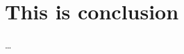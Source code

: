 \chapter{This is conclusion}\label{ch:conclusion}

\ldots

\instructionsconclusions


\cleardoublepage

